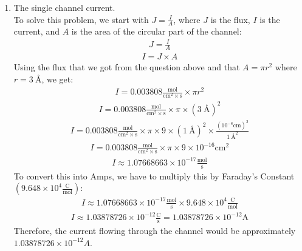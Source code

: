 \documentclass[11pt]{article}
\begin{document}
\begin{enumerate}[label=\arabic*.]
\begin{enumerate}[label=\Alph*.]
\begin{enumerate}[label=\arabic*.]
\newpage
\item
The single channel current.
\vspace*{1\baselineskip}
\\
To solve this problem, we start with $J = \frac{I} {A}$, where $J$ is the flux, $I$ is the current, and $A$ is the area of the circular part of the channel:
\begin{align*}
J = \frac{I} {A}
\end{align*}
\begin{align*}
I = J \times A
\end{align*}
Using the flux that we got from the question above and that $A = \pi r ^ 2$ where $r = \SI{3}{\angstrom}$, we get:
\begin{align*}
I =  0.003808 \frac{\text{mol}} {\text{cm} ^ {2} \times \text{s}} \times \pi r ^ 2
\end{align*}
\begin{align*}
I =  0.003808 \frac{\text{mol}} {\text{cm} ^ {2} \times \text{s}} \times \pi \times \left(\SI{3}{\angstrom}\right) ^ 2
\end{align*}
\begin{align*}
I =  0.003808 \frac{\text{mol}} {\text{cm} ^ {2} \times \text{s}} \times \pi \times 9 \times \left(\SI{1}{\angstrom}\right) ^ 2 \times \frac{\left(10 ^ {-8} \text{cm}\right) ^ 2} {\SI{1}{\angstrom} ^ 2}
\end{align*}
\begin{align*}
I =  0.003808 \frac{\text{mol}} {\text{cm} ^ {2} \times \text{s}} \times \pi \times 9 \times 10 ^ {-16} \text{cm} ^ {2}
\end{align*}
\begin{align*}
I \approx 1.07668663 \times 10 ^ {-17} \frac{\text{mol}} {\text{s}}
\end{align*}
To convert this into Amps, we have to multiply this by Faraday's Constant $\left(9.648 \times 10 ^ 4 \frac{\text{C}} {\text{mol}}\right)$:
\begin{align*}
I \approx 1.07668663 \times 10 ^ {-17} \frac{\text{mol}} {\text{s}} \times 9.648 \times 10 ^ 4 \frac{\text{C}} {\text{mol}}
\end{align*}
\begin{align*}
I \approx 1.03878726 \times 10 ^ {-12} \frac{\text{C}} {\text{s}} = 1.03878726 \times 10 ^ {-12} \text{A}
\end{align*}
Therefore, the current flowing through the  channel would be approximately $1.03878726 \times 10 ^ {-12} A$.




\end{enumerate}
\end{enumerate}
\end{enumerate}
\end{document}
